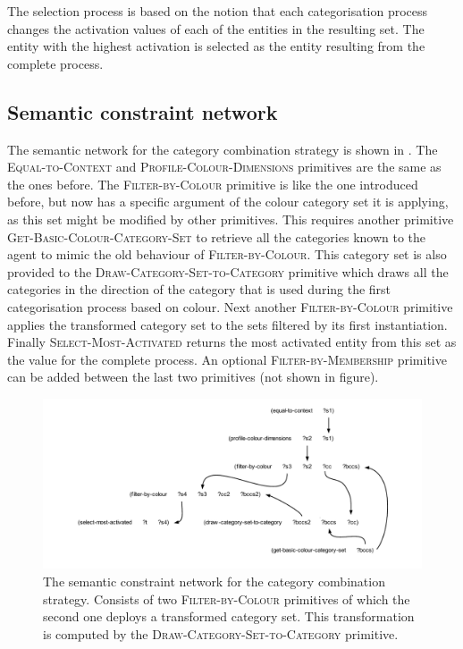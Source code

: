 The selection process is based on the notion that each categorisation
process changes the activation values of each of the entities in the
resulting set. The entity with the highest activation is selected as
the entity resulting from the complete process.

\subsection{Semantic constraint network}

The semantic network for the category combination strategy is
shown in . The
\textsc{Equal-to-Context} and \textsc{Profile-Colour-Dimensions}
primitives are the same as the ones before. The
\textsc{Filter-by-Colour} primitive is like the one introduced before,
but now has a specific argument of the colour category set it is
applying, as this set might be modified by other primitives. This
requires another primitive \textsc{Get-Basic-Colour-Category-Set} to
retrieve all the categories known to the agent to mimic the old
behaviour of \textsc{Filter-by-Colour}. This category set is also
provided to the \textsc{Draw-Category-Set-to-Category} primitive which
draws all the categories in the direction of the category that is used
during the first categorisation process based on colour. Next another
\textsc{Filter-by-Colour} primitive applies the transformed category
set to the sets filtered by its first instantiation. Finally
\textsc{Select-Most-Activated} returns the most activated entity from
this set as the value for the complete process.  An optional
\textsc{Filter-by-Membership} primitive can be added between the last
two primitives (not shown in figure).

\begin{figure}[htbp]
  \centering
  \includegraphics[width=\textwidth]{./category-combination/figures/semantic-program.pdf}
  \caption[The semantic constraint network for the category combination
  strategy]{The semantic constraint network for the category combination
      strategy. Consists of two \textsc{Filter-by-Colour} primitives
    of which the second one deploys a transformed category set. This
    transformation is computed by the
    \textsc{Draw-Category-Set-to-Category} primitive.}
  \label{f:ccs-semantic-program}
\end{figure}

